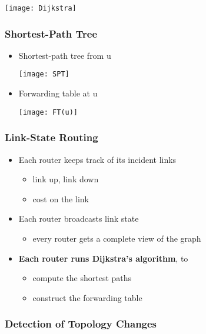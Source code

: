 \documentclass[../resumosRCOM.tex]{subfiles}
\begin{document}
\texttt{[image: Dijkstra]}

\subsubsection{Shortest-Path Tree}

\begin{itemize}
    \item Shortest-path tree from u
    \begin{center}
        \texttt{[image: SPT]}
    \end{center}
    \item Forwarding table at u
    \begin{center}
        \texttt{[image: FT(u)]}
    \end{center}
\end{itemize}

\subsubsection{Link-State Routing}

\begin{itemize}
    \item Each router keeps track of its incident links
    \begin{itemize}
        \item link up, link down
        \item cost on the link
    \end{itemize}
    \item Each router broadcasts link state
    \begin{itemize}
        \item every router gets a complete view of the graph
    \end{itemize}
    \item \textbf{Each router runs Dijkstra’s algorithm}, to
    \begin{itemize}
        \item compute the shortest paths
        \item construct the forwarding table
    \end{itemize}
\end{itemize}

\subsubsection{Detection of Topology Changes}
\end{document}
